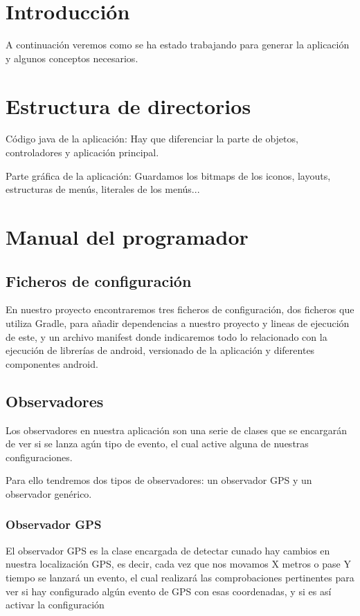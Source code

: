 
\section{Introducción}
A continuación veremos como se ha estado trabajando para generar la aplicación y algunos conceptos necesarios.
\section{Estructura de directorios}

Código java de la aplicación:
Hay que diferenciar la parte de objetos, controladores y aplicación principal.

Parte gráfica de la aplicación:
Guardamos los bitmaps de los iconos, layouts, estructuras de menús, literales de los menús...

\section{Manual del programador}
\subsection{Ficheros de configuración}
En nuestro proyecto encontraremos tres ficheros de configuración, dos ficheros que utiliza Gradle, para añadir dependencias a nuestro proyecto y lineas de ejecución de este, y un archivo manifest donde indicaremos todo lo relacionado con la ejecución de librerías de android, versionado de la aplicación y diferentes componentes android.
\subsection{Observadores}
Los observadores en nuestra aplicación son una serie de clases que se encargarán de ver si se lanza agún tipo de evento, el cual active alguna de nuestras configuraciones.

Para ello tendremos dos tipos de observadores: un observador GPS y un observador genérico.
\subsubsection{Observador GPS}
El observador GPS es la clase encargada de detectar cunado hay cambios en nuestra localización GPS, es decir, cada vez que nos movamos X metros o pase Y tiempo se lanzará un evento, el cual realizará las comprobaciones pertinentes para ver si hay configurado algún evento de GPS con esas coordenadas, y si es así activar la configuración 

